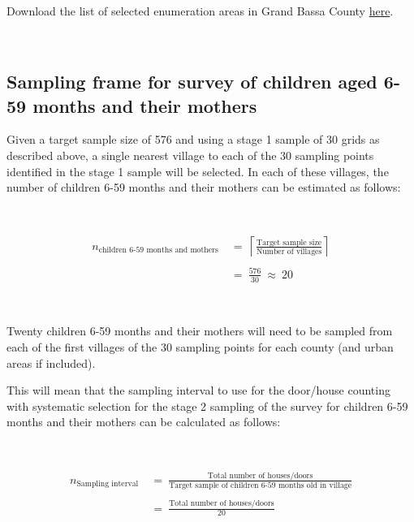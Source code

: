 \documentclass[12pt,a4paper]{book}
\theoremstyle{definition}
\theoremstyle{definition}
\theoremstyle{definition}
\theoremstyle{remark}
\let\BeginKnitrBlock\begin \let\EndKnitrBlock\end
\begin{document}
~

\BeginKnitrBlock{rmddownload}
Download the list of selected enumeration areas in Grand Bassa County
\href{data/grandBassaSPlist.csv}{here}.
\EndKnitrBlock{rmddownload}

~

\hypertarget{sampling-frame-for-survey-of-children-aged-6-59-months-and-their-mothers}{%
\subsection{Sampling frame for survey of children aged 6-59 months and
their
mothers}\label{sampling-frame-for-survey-of-children-aged-6-59-months-and-their-mothers}}

Given a target sample size of 576 and using a stage 1 sample of 30 grids
as described above, a single nearest village to each of the 30 sampling
points identified in the stage 1 sample will be selected. In each of
these villages, the number of children 6-59 months and their mothers can
be estimated as follows:

~

\[\begin{aligned} 
n_{\text{children 6-59 months and mothers}} & ~ = ~ \left \lceil \frac{\text{Target sample size}}{\text{Number of villages}} \right \rceil \\
\\
& ~ = ~ \frac{576}{30} ~ \approx ~ 20
\end{aligned}\]

~

Twenty children 6-59 months and their mothers will need to be sampled
from each of the first villages of the 30 sampling points for each
county (and urban areas if included).

This will mean that the sampling interval to use for the door/house
counting with systematic selection for the stage 2 sampling of the
survey for children 6-59 months and their mothers can be calculated as
follows:

~

\[\begin{aligned}
n_{\text{Sampling interval}} & ~ = ~ \frac{\text{Total number of houses/doors}}{\text{Target sample of children 6-59 months old in village}} \\
\\
& ~ = ~ \frac{\text{Total number of houses/doors}}{\text{20}}
\end{aligned}\]

\newpage
\end{document}
